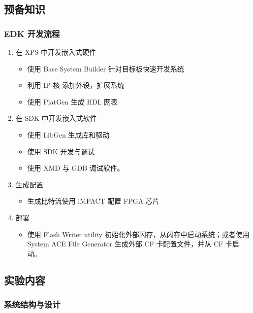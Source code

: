 \documentclass{ctexart}
\begin{document}
        \subsection{预备知识}
        
        \subsubsection{EDK 开发流程}
        
        \begin{enumerate}
            \item 在 XPS 中开发嵌入式硬件
            \begin{itemize}
                \item 使用 Base System Builder 针对目标板快速开发系统
                \item 利用 IP 核 添加外设，扩展系统
                \item 使用 PlatGen 生成 HDL 网表
            \end{itemize}
            \item 在 SDK 中开发嵌入式软件
            \begin{itemize}
                \item 使用 LibGen 生成库和驱动
                \item 使用 SDK 开发与调试
                \item 使用 XMD 与 GDB 调试软件。
            \end{itemize}
            \item 生成配置
            \begin{itemize}
                \item 生成比特流使用 iMPACT 配置 FPGA 芯片
            \end{itemize}
            \item 部署
            \begin{itemize}
                \item 使用 Flash Writer utility 初始化外部闪存，从闪存中启动系统；或者使用 System ACE File Generator 生成外部 CF 卡配置文件，并从 CF 卡启动。
            \end{itemize}
        \end{enumerate}
        
        \subsection{实验内容}
        
        \subsubsection{系统结构与设计}
        
\end{document}

